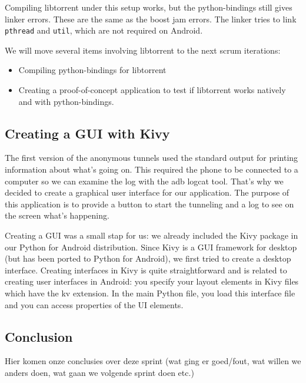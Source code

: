 		Compiling libtorrent under this setup works, but the python-bindings still gives linker errors. These are the same as the boost jam errors. The linker tries to link \texttt{pthread} and \texttt{util}, which are not required on Android.
		
		We will move several items involving libtorrent to the next scrum iterations:
		\begin{itemize}
		\item Compiling python-bindings for libtorrent
		\item Creating a proof-of-concept application to test if libtorrent works natively and with python-bindings.
		\end{itemize}
	
	\subsection{Creating a GUI with Kivy}
		The first version of the anonymous tunnels used the standard output for printing information about what’s going on. This required the phone to be connected to a computer so we can examine the log with the adb logcat tool. That’s why we decided to create a graphical user interface for our application. The purpose of this application is to provide a button to start the tunneling and a log to see on the screen what’s happening.
	
		Creating a GUI was a small stap for us: we already included the Kivy package in our Python for Android distribution. Since Kivy is a GUI framework for desktop (but has been ported to Python for Android), we first tried to create a desktop interface. Creating interfaces in Kivy is quite straightforward and is related to creating user interfaces in Android: you specify your layout elements in Kivy files which have the kv extension. In the main Python file, you load this interface file and you can access properties of the UI elements.
	
	\subsection{Conclusion}
		Hier komen onze conclusies over deze sprint (wat ging er goed/fout, wat willen we anders doen, wat gaan we volgende sprint doen etc.)

